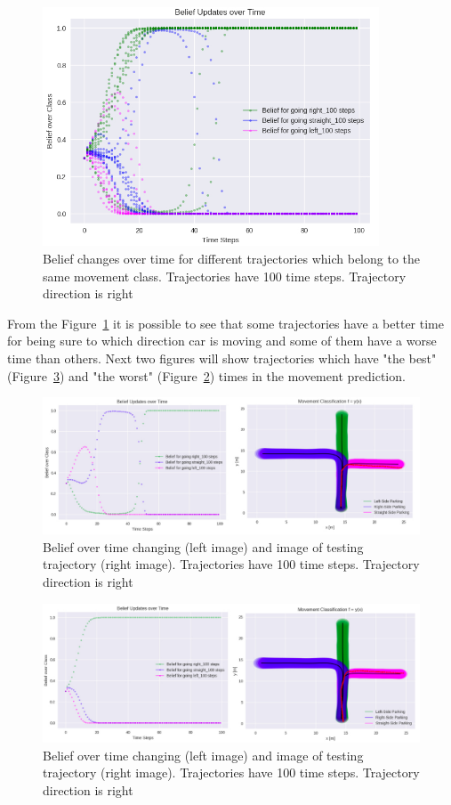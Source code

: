 \begin{figure}[H]
	\centering  	
	\includegraphics[width=10cm]{img/10_rights.jpg}
	\caption{Belief changes over time for different trajectories which belong to the same movement class. Trajectories have 100 time steps. Trajectory direction is right}
	\label{fig:10Rights}    
\end{figure}

From the Figure~\ref{fig:10Rights} it is possible to see that some trajectories have a better time for being sure to which direction car is moving and some of them have a worse time than others. Next two figures will show trajectories which have "the best" (Figure~\ref{fig:RightGood}) and "the worst" (Figure~\ref{fig:RightBad}) times in the movement prediction.

\begin{figure}[H]
	\centering  	
	\includegraphics[width=15cm]{img/bad_right_tr.jpg}
	\caption{Belief over time changing (left image) and image of testing trajectory (right image). Trajectories have 100 time steps. Trajectory direction is right}
	\label{fig:RightBad}    
\end{figure}

\begin{figure}[H]
	\centering  	
	\includegraphics[width=15cm]{img/good_right_tr.jpg}
	\caption{Belief over time changing (left image) and image of testing trajectory (right image). Trajectories have 100 time steps. Trajectory direction is right}
	\label{fig:RightGood}    
\end{figure}

